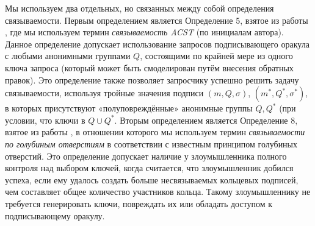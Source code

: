\documentclass{llncs}
\begin{document}
Мы используем два отдельных, но связанных между собой определения связываемости. Первым определением является Определение 5, взятое из работы \cite{au2006short}, где мы используем термин \textit{связываемость ACST} (по инициалам автора). Данное определение допускает использование запросов подписывающего оракула с любыми анонимными группами $Q$, состоящими по крайней мере из одного ключа запроса (который может быть смоделирован путём внесения обратных правок). Это определение также позволяет запросчику успешно решить задачу связываемости, используя тройные значения подписи $(m, Q, \sigma)$, $(m^*, Q^*, \sigma^*)$, в которых присутствуют «полуповреждённые» анонимные группы $Q, Q^*$ (при условии, что ключи в $Q \cup Q^*$. Вторым определением является Определение 8, взятое из работы \cite{backes2019ring}, в отношении которого мы используем термин \textit{связываемости по голубиным отверстиям} в соответствии с известным принципом голубиных отверстий. Это определение допускает наличие у злоумышленника полного контроля над выбором ключей, когда считается, что злоумышленник добился успеха, если ему удалось создать больше несвязываемых кольцевых подписей, чем составляет общее количество участников кольца. Такому злоумышленнику не требуется генерировать ключи, повреждать их или обладать доступом к подписывающему оракулу.
\end{document}
